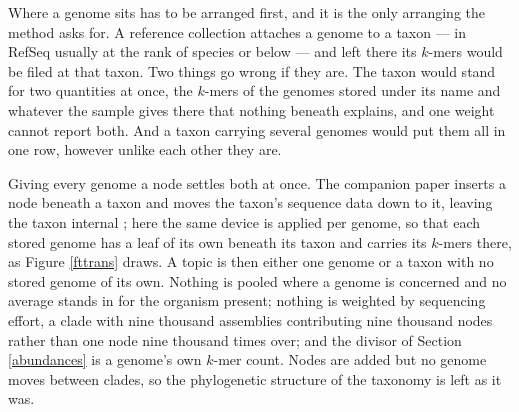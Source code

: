 \documentclass[pdflatex,sn-vancouver-num]{sn-jnl}
\begin{document}
    Where a genome sits has to be arranged first, and it is the only arranging the method asks for.
    A reference collection attaches a genome to a taxon --- in RefSeq usually at the rank of species
    or below --- and left there its $k$-mers would be filed at that taxon. Two things go wrong if they
    are. The taxon would stand for two quantities at once, the $k$-mers of the genomes stored under
    its name and whatever the sample gives there that nothing beneath explains, and one weight cannot
    report both. And a taxon carrying several genomes would put them all in one row, however unlike
    each other they are.

    Giving every genome a node settles both at once. The companion paper inserts a node beneath a
    taxon and moves the taxon's sequence data down to it, leaving the taxon internal
    \citep{genestrip-ft}; here the same device is applied per genome, so that each stored genome has a
    leaf of its own beneath its taxon and carries its $k$-mers there, as Figure \ref{fttrans} draws.
    A topic is then either one genome or a taxon with no stored genome of its own. Nothing is pooled where a genome is
    concerned and no average stands in for the organism present; nothing is weighted by sequencing
    effort, a clade with nine thousand assemblies contributing nine thousand nodes rather than one
    node nine thousand times over; and the divisor of Section \ref{abundances} is a genome's own
    $k$-mer count. Nodes are added but no genome moves between clades, so the phylogenetic structure
    of the taxonomy is left as it was.
\end{document}
